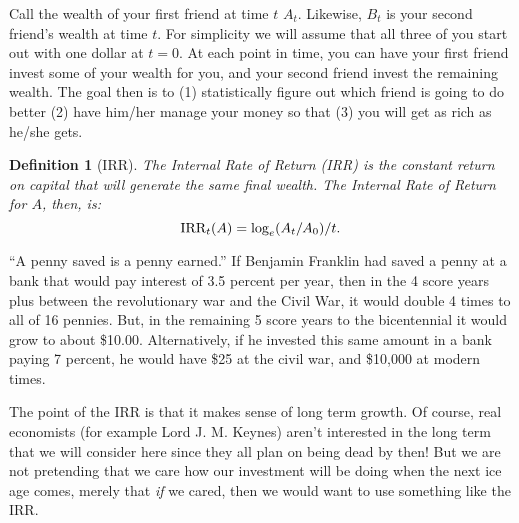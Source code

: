 \documentclass{book}
\newtheorem{definition}{Definition}[chapter]
\begin{document}
Call the wealth of your first friend at time $t$ $A_t$.  Likewise,
$B_t$ is your second friend's wealth at time $t$.  For simplicity we
will assume that all three of you
start out with one dollar at $t=0$.  At each point in time, you can
have your first friend invest some of your wealth for you, and your
second friend invest the remaining wealth.  The goal then is to (1)
statistically figure out which friend is going to do better (2) have
him/her manage your money so that (3) you will get as rich as he/she gets.

\begin{definition}[IRR]  \label{def:log} The Internal Rate of Return
(IRR) is the constant return on capital that will generate the same
  final wealth.  \label{def:IRR_1} The Internal Rate of Return for $A$,
  then, is: \begin{displaymath} \hbox{IRR}_t(A) = \log_e(A_t/A_0)/t.
  \end{displaymath}
\end{definition}
``A penny saved is a penny earned.''  If Benjamin Franklin had saved a
penny at a bank that would pay interest of 3.5 percent per year, then
in the  4 score years plus between the revolutionary war and the Civil
War, it would double 4 times to all of 16 pennies.  But, in the
remaining 5 score years to the bicentennial it would grow to about
\$10.00.  Alternatively, if he invested this same amount in a bank
paying 7 percent, he would have \$25 at the civil war, and \$10,000 at
modern times. 

The point of the IRR is that it makes sense of long term growth. Of
course, real economists (for example Lord J. M. Keynes) aren't
interested in the long term that we will consider here since they all
plan on being dead by then!  But we are not pretending that we care
how our investment will be doing when the next ice age comes, merely
that {\it if} we cared, then we would want to use something like the
IRR.
\end{document}
